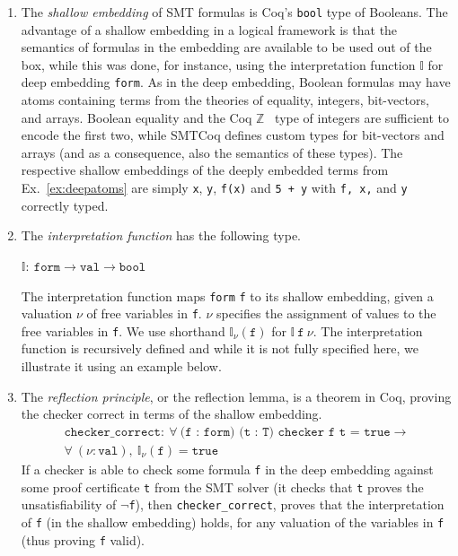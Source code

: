 \documentclass{article}
\begin{document}
	\begin{enumerate}
		\item The \emph{shallow 
		embedding} of SMT formulas
		is Coq's \texttt{bool} 
		type of Booleans. The 
		advantage of a shallow 
		embedding in a logical 
		framework is that  the 
		semantics of formulas in 
		the embedding are 
		available to be used 
		out of the box, while 
		this was done, for 
		instance, using the 
		interpretation function
		$\mathbb{I}$ for deep 
		embedding \texttt{form}.
		As in the deep embedding, 
		Boolean	formulas may have 
		atoms containing terms from 
		the theories of equality, 
		integers, bit-vectors,
		and arrays. Boolean equality 
		and	the Coq 
		$\mathbb{Z}$~\cite{CoqZ} type 
		of integers are sufficient 
		to encode the first two, 
		while SMTCoq defines custom 
		types for bit-vectors and 
		arrays (and as a consequence,
		also the semantics of these
		types). The respective 
		shallow embeddings of
		the deeply embedded terms from 
		Ex.~\ref{ex:deepatoms} are simply
		\texttt{x}, \texttt{y}, \texttt{f(x)} 
		and \texttt{5 + y} 
		with \texttt{f, x,} and \texttt{y}
		correctly typed. 
	
		\item The \emph{interpretation 
		function} has the following type.
		\begin{center}
			$\mathbb{I} :\ \texttt{form} \to 
			\texttt{val} \to \texttt{bool}$
		\end{center}
		The interpretation function maps 
		\texttt{form} \texttt{f} to 
		its shallow embedding, given 
		a valuation $\nu$ of free 
		variables in \texttt{f}. 
		$\nu$ specifies the assignment 
		of values to the free variables in 
		\texttt{f}. We use shorthand 
		$\mathbb{I}_{\nu}
		(\texttt{f})$ for $\mathbb{I}\ 
		\texttt{f}\ \nu$. The interpretation
		function is recursively defined
		and while it is not fully 
		specified here, we 
		illustrate it using an 
		example below.
	
		\item The \emph{reflection 
		principle}, or the 
		reflection lemma, is a 
		theorem in Coq, proving the 
		checker correct in terms of 
		the shallow embedding.
		\begin{align*}
			\texttt{checker\_correct} :\ 
			\forall\ \texttt{(f : form)
			(t : T) checker f t = true} 
			\to \\
			\forall\ (\nu : \texttt{val}),\ 
			\mathbb{I}_{\nu}(\texttt{f}) = 
			\texttt{true}
		\end{align*}
		If a checker is able to check 
		some formula \texttt{f} in 
		the deep embedding against
		some proof certificate 
		\texttt{t} from 
		the SMT solver (it checks that 
		\texttt{t} proves the 
		unsatisfiability
		of \texttt{$\neg$f}), then 
		\texttt{checker\_correct},
		proves that the 
		interpretation of \texttt{f}
		(in the shallow embedding)
		holds, for any valuation of 
		the variables in \texttt{f} 
		(thus proving \texttt{f} valid). 
	

\end{enumerate}
\end{document}
